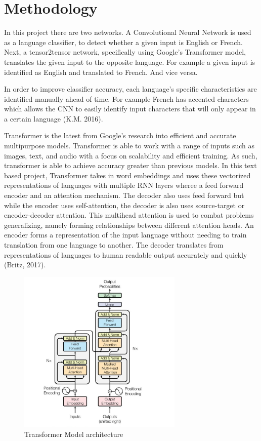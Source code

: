 \documentclass[10pt,a4paper]{article}
\begin{document}
\clearpage


\section{Methodology}

In this project there are two networks. A Convolutional Neural Network is used as a language classifier, to detect whether a given input is English or French. Next, a tensor2tensor network, specifically using Google's Transformer model, translates the given input to the opposite language. For example a given input is identified as English and translated to French. And vice versa.
  
  
In order to improve classifier accuracy, each language’s specific characteristics are identified manually ahead of time. For example French has accented characters which allows the CNN to easily identify input characters that will only appear in a certain language (K.M. 2016).
  
  
 Transformer is the latest from Google's research into efficient and accurate multipurpose models. Transformer is able to work with a range of inputs such as images, text, and audio with a focus on scalability and efficient training. As such, transformer is able to achieve accuracy greater than previous models. In this text based project, Transformer takes in word embeddings and uses these vectorized representations of languages with multiple RNN layers wheree a feed forward encoder and an attention mechanism. The decoder also uses feed forward but while the encoder uses self-attention, the decoder is also uses source-target or encoder-decoder attention. This multihead attention is used to combat problems generalizing, namely forming relationships between different attention heads. An encoder forms a representation of the input language without needing to train translation from one language to another. The decoder translates from representations of languages to human readable output accurately and quickly (Britz, 2017).
   
   
\begin{figure}[H]
  \begin{center}
    \includegraphics[width=0.7\textwidth] {transformer.jpg}
    \caption{Transformer Model architecture}
  \end{center}
\end{figure}
\end{document}
